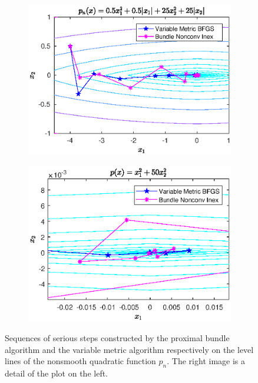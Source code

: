 \begin{figure}[ht]
	\begin{subfigure}[t]{0.49\textwidth}
		\includegraphics[width=\textwidth]{Pictures/Plots/final_nonsm_parab.eps}
	\end{subfigure}
	\begin{subfigure}[t]{0.49\textwidth}
		\begin{center}
			\includegraphics[width=\textwidth]{Pictures/Plots/final_nonsm_parab_detail.eps}
		\end{center}
	\end{subfigure}
	\caption{Sequences of serious steps constructed by the proximal bundle algorithm and the variable metric algorithm respectively on the level lines of the nonsmooth quadratic function \(p_n\). The right image is a detail of the plot on the left.}
	\label{fig_Nonsm_Parab}
\end{figure}

